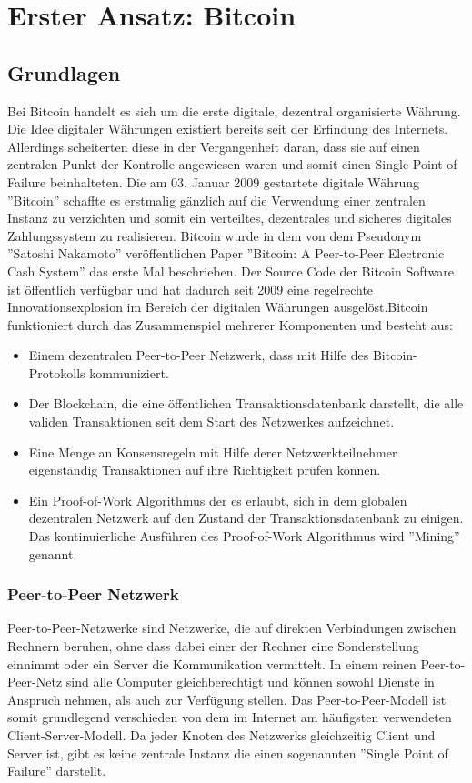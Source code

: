\chapter{Erster Ansatz: Bitcoin}
\label{btc}

\section{Grundlagen}
Bei Bitcoin handelt es sich um die erste digitale, dezentral organisierte Währung. Die Idee digitaler Währungen existiert bereits seit der Erfindung des Internets. Allerdings scheiterten diese in der Vergangenheit daran, dass sie auf einen zentralen Punkt der Kontrolle angewiesen waren und somit einen Single Point of Failure beinhalteten. Die am 03. Januar 2009 gestartete digitale Währung ''Bitcoin'' schaffte es erstmalig gänzlich auf die Verwendung einer zentralen Instanz zu verzichten und somit ein verteiltes, dezentrales und sicheres digitales Zahlungssystem zu realisieren. Bitcoin wurde in dem von dem Pseudonym ''Satoshi Nakamoto'' veröffentlichen Paper ''Bitcoin: A Peer-to-Peer Electronic Cash System'' das erste Mal beschrieben. \if Der Source Code der Bitcoin Software ist öffentlich verfügbar und hat dadurch seit 2009 eine regelrechte Innovationsexplosion im Bereich der digitalen Währungen ausgelöst.\fi Bitcoin funktioniert durch das Zusammenspiel mehrerer Komponenten und besteht aus:

\begin{itemize}
\item Einem dezentralen Peer-to-Peer Netzwerk, dass mit Hilfe des Bitcoin-Protokolls kommuniziert.
\item Der Blockchain, die eine öffentlichen Transaktionsdatenbank darstellt, die alle validen Transaktionen seit dem Start des Netzwerkes aufzeichnet.
\item Eine Menge an Konsensregeln mit Hilfe derer Netzwerkteilnehmer eigenständig Transaktionen auf ihre Richtigkeit prüfen können.
\item Ein Proof-of-Work Algorithmus der es erlaubt, sich in dem globalen dezentralen Netzwerk auf den Zustand der Transaktionsdatenbank zu einigen. Das kontinuierliche Ausführen des Proof-of-Work Algorithmus wird ''Mining'' genannt.
\end{itemize}

\subsection{Peer-to-Peer Netzwerk}
Peer-to-Peer-Netzwerke sind Netzwerke, die auf direkten Verbindungen zwischen Rechnern beruhen, ohne dass dabei einer der Rechner eine Sonderstellung einnimmt oder ein Server die Kommunikation vermittelt. In einem reinen Peer-to-Peer-Netz sind alle Computer gleichberechtigt und können sowohl Dienste in Anspruch nehmen, als auch zur Verfügung stellen. Das Peer-to-Peer-Modell ist somit grundlegend verschieden von dem im Internet am häufigsten verwendeten Client-Server-Modell. Da jeder Knoten des Netzwerks gleichzeitig Client und Server ist, gibt es keine zentrale Instanz die einen sogenannten ''Single Point of Failure'' darstellt. 

